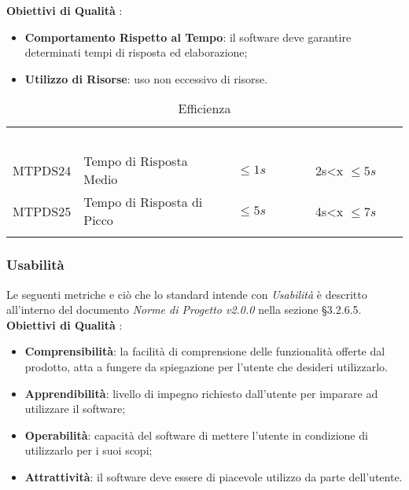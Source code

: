\textbf{Obiettivi di Qualità} :

\begin{itemize}
	\item \textbf{Comportamento Rispetto al Tempo}: il software deve garantire determinati tempi di risposta ed elaborazione;
	\item \textbf{Utilizzo di Risorse}: uso non eccessivo di risorse.
\end{itemize}

\begin{longtable}{|C{.15\textwidth}|C{.24\textwidth}|C{.24\textwidth}|C{.24\textwidth}|}
\hline
{}\textbf{\textcolor{white}{ID}} & \textbf{\textcolor{white}{Nome}} & \textbf{\textcolor{white}{Ottimalità}} & \textbf{\textcolor{white}{Accettabilità}}\\
MTPDS24 & Tempo di Risposta Medio & $\leq 1s$ & 2s<x $\leq 5s$\\
\hline
{}MTPDS25 & Tempo di Risposta di Picco  & $\leq 5s$ & 4s<x $\leq 7s$ \\ 
\hline
\caption{Efficienza}
\label{Efficienza}
\end{longtable}



\subsubsection{Usabilità}

Le seguenti metriche e ciò che lo standard intende con \textit{Usabilità} è descritto all'interno del documento \textit{Norme di Progetto v2.0.0} nella sezione §3.2.6.5. \\

\textbf{Obiettivi di Qualità} :

\begin{itemize}
	\item \textbf{Comprensibilità}: la facilità di comprensione delle funzionalità offerte dal prodotto, atta a fungere da spiegazione per l'utente che desideri utilizzarlo. 
	\item \textbf{Apprendibilità}: livello di impegno richiesto dall'utente per imparare ad utilizzare il software;
	\item \textbf{Operabilità}: capacità del software di mettere l'utente in condizione di utilizzarlo per i suoi scopi; 
	\item \textbf{Attrattività}: il software deve essere di piacevole utilizzo da parte dell'utente.
\end{itemize}

